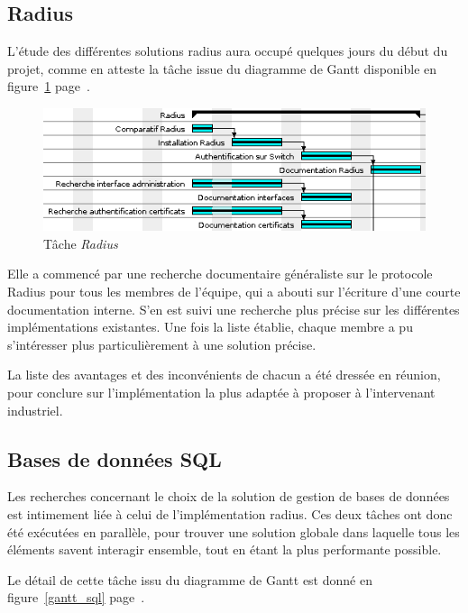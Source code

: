 \subsection{Radius}

L'étude des différentes solutions radius aura occupé quelques jours du début du projet, comme en atteste la tâche issue du diagramme de Gantt disponible en figure~\ref{gantt_radius} page~\pageref{gantt_radius}.

\begin{figure}[!h]
	\begin{center}
		\includegraphics[width=350pt]{img/gantt_radius.png}
	\end{center}
	\caption{Tâche \textit{Radius}}
	\label{gantt_radius}
\end{figure}

Elle a commencé par une recherche documentaire généraliste sur le protocole Radius pour tous les membres de l'équipe, qui a abouti sur l'écriture d'une courte documentation interne. S'en est suivi une recherche plus précise sur les différentes implémentations existantes. Une fois la liste établie, chaque membre a pu s'intéresser plus particulièrement à une solution précise.

La liste des avantages et des inconvénients de chacun a été dressée en réunion, pour conclure sur l'implémentation la plus adaptée à proposer à l'intervenant industriel.

\subsection{Bases de données SQL}

Les recherches concernant le choix de la solution de gestion de bases de données est intimement liée à celui de l'implémentation radius. Ces deux tâches ont donc été exécutées en parallèle, pour trouver une solution globale dans laquelle tous les éléments savent interagir ensemble, tout en étant la plus performante possible.

Le détail de cette tâche issu du diagramme de Gantt est donné en figure~\ref{gantt_sql} page~\pageref{gantt_sql}.

